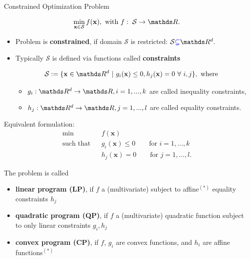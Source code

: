 \begin{vbframe}{Constrained Optimization Problem }

$$
\min_{\xv \in \mathcal{S}} \fx, \text{ with } f: \; \mathcal{S} \to \R.
$$

\begin{itemize}
	\item Problem is \textbf{constrained}, if domain $\mathcal{S}$ is restricted: $\mathcal{S} \textcolor{blue}{\subsetneq} \R^d.$

	\item Typically $\mathcal{S}$ is defined via functions called \textbf{constraints}

	$$
		\mathcal{S}:= \{\xv \in \R^d ~|~ g_i(\xv) \le 0, h_j(\xv) = 0 ~\forall~ i, j\}, \text{ where }
	$$ 

\begin{itemize}
\item $g_i: \R^d \to \R, i = 1, ..., k$ are called inequality constraints,
\item $h_j: \R^d \to \R, j = 1, ..., l$ are called equality constraints.
\end{itemize}

\end{itemize}

\lz 

Equivalent formulation: 
\begin{eqnarray*}
\min && f(\mathbf{x})  \\
\text{such that} && g_i(\mathbf{x}) \le 0 \qquad \text{for } i=1,\ldots,k  \\
 && h_j(\mathbf{x}) = 0 \qquad \text{for } j=1,\ldots,l. 
\end{eqnarray*}

\framebreak 

The problem is called

\begin{itemize}
	\item \textbf{linear program (LP)}, if $f$ a (multivariate) subject to affine$^{(*)}$ equality constraints $h_j$
	\item \textbf{quadratic program (QP)}, if $f$ a (multivariate) quadratic function subject to only linear constraints $g_i, h_j$
	\item \textbf{convex program (CP)}, if $f$, $g_i$ are convex functions, and $h_i$ are affine functions$^{(*)}$
\end{itemize}


\end{vbframe}
